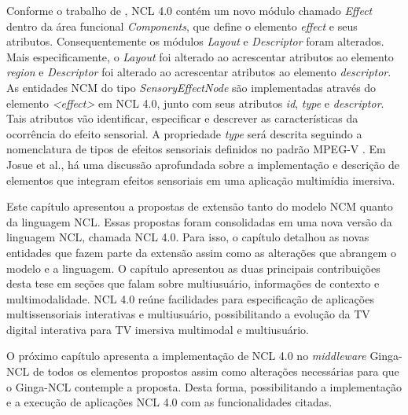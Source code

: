 Conforme o trabalho de \cite{Josue:2018:MSE:3204949.3204967}, NCL 4.0 contém um novo módulo chamado \textit{Effect} dentro da área funcional \textit{Components}, que define o elemento \textit{effect} e seus atributos. Consequentemente os módulos \textit{Layout} e \textit{Descriptor} foram alterados. Mais especificamente, o \textit{Layout} foi alterado ao acrescentar atributos ao elemento \textit{region} e \textit{Descriptor} foi alterado ao acrescentar atributos ao elemento \textit{descriptor}. As entidades NCM do tipo \textit{SensoryEffectNode} são implementadas através do elemento \textit{<effect>} em NCL 4.0, junto com seus atributos \textit{id}, \textit{type} e \textit{descriptor}. Tais atributos vão identificar, especificar e descrever as características da ocorrência do efeito sensorial. A propriedade \textit{type} será descrita seguindo a nomenclatura de tipos de efeitos sensoriais definidos no padrão MPEG-V \cite{yoon2015mpeg}. Em Josue et al.\cite{Josue:2018:MSE:3204949.3204967}, há uma discussão aprofundada sobre a implementação e descrição de elementos que integram efeitos sensoriais em uma aplicação multimídia imersiva. %


Este capítulo apresentou a propostas de extensão tanto do modelo NCM quanto da linguagem NCL. Essas propostas foram consolidadas em uma nova versão da linguagem NCL, chamada NCL 4.0. Para isso, o capítulo detalhou as novas entidades que fazem parte da extensão assim como as alterações que abrangem o modelo e a linguagem. O capítulo apresentou as duas principais contribuições desta tese em seções que falam sobre multiusuário, informações de contexto e multimodalidade. NCL 4.0 reúne facilidades para especificação de aplicações  multissensoriais interativas e multiusuário, possibilitando a evolução da TV digital interativa para TV imersiva multimodal e multiusuário.

O próximo capítulo apresenta a  implementação de NCL 4.0 no \textit{middleware} Ginga-NCL de todos os elementos propostos assim como alterações necessárias para que o Ginga-NCL contemple a proposta. Desta forma, possibilitando a implementação e a execução de aplicações NCL 4.0 com as funcionalidades citadas.
